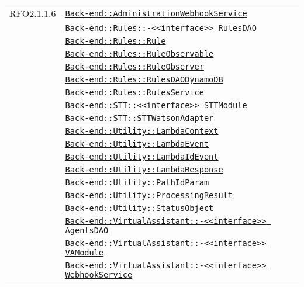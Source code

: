 \begin{longtable}{|>{\centering}m{3cm}|m{10cm}<{\centering}|}
RFO2.1.1.6 & \hyperref[Back-end::AdministrationWebhookService]{\texttt{Back-end::AdministrationWebhookService}}\\
& \hyperref[Back-end::Rules::<<interface>> RulesDAO]{\texttt{Back-end::Rules::-\linebreak <<interface>> RulesDAO}}\\
& \hyperref[Back-end::Rules::Rule]{\texttt{Back-end::Rules::Rule}}\\
& \hyperref[Back-end::Rules::RuleObservable]{\texttt{Back-end::Rules::RuleObservable}}\\
& \hyperref[Back-end::Rules::RuleObserver]{\texttt{Back-end::Rules::RuleObserver}}\\
& \hyperref[Back-end::Rules::RulesDAODynamoDB]{\texttt{Back-end::Rules::RulesDAODynamoDB}}\\
& \hyperref[Back-end::Rules::RulesService]{\texttt{Back-end::Rules::RulesService}}\\
& \hyperref[Back-end::STT::<<interface>> STTModule]{\texttt{Back-end::STT::<<interface>> STTModule}}\\
& \hyperref[Back-end::STT::STTWatsonAdapter]{\texttt{Back-end::STT::STTWatsonAdapter}}\\
& \hyperref[Back-end::Utility::LambdaContext]{\texttt{Back-end::Utility::LambdaContext}}\\
& \hyperref[Back-end::Utility::LambdaEvent]{\texttt{Back-end::Utility::LambdaEvent}}\\
& \hyperref[Back-end::Utility::LambdaIdEvent]{\texttt{Back-end::Utility::LambdaIdEvent}}\\
& \hyperref[Back-end::Utility::LambdaResponse]{\texttt{Back-end::Utility::LambdaResponse}}\\
& \hyperref[Back-end::Utility::PathIdParam]{\texttt{Back-end::Utility::PathIdParam}}\\
& \hyperref[Back-end::Utility::ProcessingResult]{\texttt{Back-end::Utility::ProcessingResult}}\\
& \hyperref[Back-end::Utility::StatusObject]{\texttt{Back-end::Utility::StatusObject}}\\
& \hyperref[Back-end::VirtualAssistant::<<interface>> AgentsDAO]{\texttt{Back-end::VirtualAssistant::-\linebreak <<interface>> AgentsDAO}}\\
& \hyperref[Back-end::VirtualAssistant::<<interface>> VAModule]{\texttt{Back-end::VirtualAssistant::-\linebreak <<interface>> VAModule}}\\
& \hyperref[Back-end::VirtualAssistant::<<interface>> WebhookService]{\texttt{Back-end::VirtualAssistant::-\linebreak <<interface>> WebhookService}}\\

\end{longtable}
